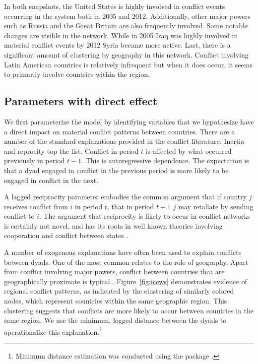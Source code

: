 In both snapshots, the United States is highly involved in conflict events occurring in the system both in 2005 and 2012. Additionally, other major powers such as Russia and the Great Britain are also frequently involved. Some notable changes are visible in the network. While in 2005 Iraq was highly involved in material conflict events by 2012 Syria became more active. Last, there is a significant amount of clustering by geography in this network. Conflict involving Latin American countries is relatively infrequent but when it does occur, it seems to primarily involve countries within the region.

\subsection*{Parameters with direct effect}

We first parameterize the model by identifying variables that we hypothesize have a direct impact on material conflict patterns between countries. There are a number of the standard explanations provided in the conflict literature. Inertia and reprocity top the list. Conflict in period $t$ is affected by what occurred previously in period $t-1$. This is autoregressive dependence. The expectation is that a dyad engaged in conflict in the previous period is more likely to be engaged in conflict in the next.

A lagged reciprocity parameter embodies the common argument that if country $j$ receives conflict from $i$ in period $t$, that in period $t+1$ $j$ may retaliate by sending conflict to $i$. The argument that reciprocity is likely to occur in conflict networks is certainly not novel, and has its roots in well known theories involving cooperation and conflict between states \citep{richardson:1960,choucri:north:1972,goldstein:1992}.

A number of exogenous explanations have often been used to explain conflicts between dyads. One of the most common relates to the role of geography. Apart from conflict involving major powers, conflict between countries that are geographically proximate is typical \citep{bremer:1992,diehl:goertz:2000,carter:goemans:2011}. Figure~\ref{fig:icews} demonstrates evidence of regional conflict patterns, as indicated by the clustering of similarly colored nodes, which represent countries within the same geographic region. This clustering suggests that conflicts are more likely to occur between countries in the same region. We use the minimum, logged distance between the dyads to operationalize this explanation.\footnote{Minimum distance estimation was conducted using the  package \citep{weidmann:etal:2010a}.}

